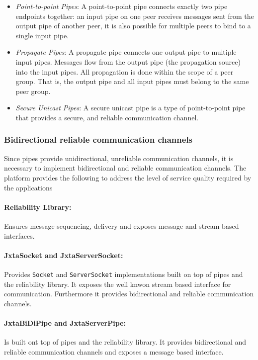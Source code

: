 \begin{itemize}
 \item \emph{Point-to-point Pipes}: A point-to-point pipe connects exactly two pipe endpoints together: an input pipe on one peer receives messages sent from the output pipe of another peer, it is also possible for multiple peers to bind to a single input pipe. 
 \item \emph{Propagate Pipes}: A propagate pipe connects one output pipe to multiple input pipes. Messages flow from the output pipe (the propagation source) into the input pipes. All propagation is done within the scope of a peer group. That is, the output pipe and all input pipes must belong to the same peer group. 
 \item \emph{Secure Unicast Pipes}: A secure unicast pipe is a type of point-to-point pipe that provides a secure, and reliable communication channel. 
\end{itemize}

\subsubsection{Bidirectional reliable communication channels}
Since pipes provide unidirectional, unreliable communication channels, it is necessary to implement bidirectional and reliable communication channels. The platform provides the following to address the level of service quality required by the applications
\paragraph{Reliability Library:} Ensures message sequencing, delivery and exposes message and stream based interfaces.
\paragraph{JxtaSocket and JxtaServerSocket:} Provides \texttt{Socket} and \texttt{ServerSocket} implementations built on top of pipes and the reliability library. It exposes the well knwon stream based interface for communication. Furthermore it provides bidirectional and reliable communication channels.
\paragraph{JxtaBiDiPipe and JxtaServerPipe:} Is built ont top of pipes and the reliability library. It provides bidirectional and reliable communication channels and exposes a message based interface.

